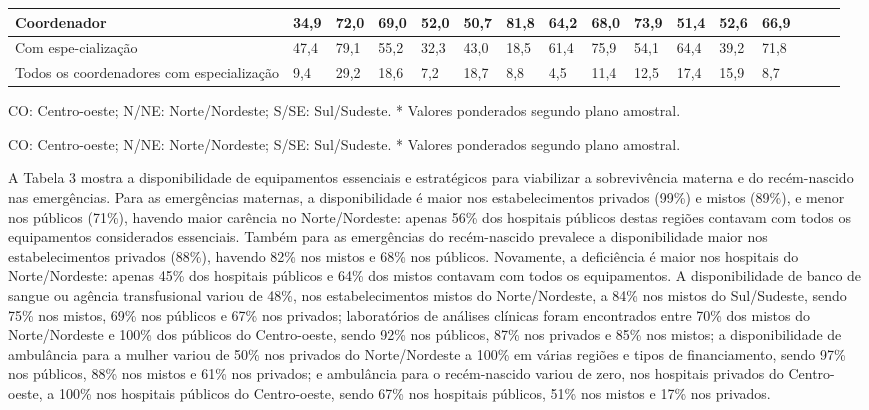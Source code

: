 \documentclass{article}
\begin{document}
\begin{table}
\begin{xtabular}{ l | l | l | l l | l | l | l | l | l | l | l | l | l | l | l }
Coordenador
& 34,9
& 72,0
& 69,0
& 52,0
& 50,7
& 81,8
& 64,2
& 68,0
& 73,9
& 51,4
& 52,6
& 66,9
\\ \hline

Com espe-cialização
& 47,4
& 79,1
& 55,2
& 32,3
& 43,0
& 18,5
& 61,4
& 75,9
& 54,1
& 64,4
& 39,2
& 71,8
\\ \hline

Todos os coordenadores com especialização
& 9,4
& 29,2
& 18,6
& 7,2
& 18,7
& 8,8
& 4,5
& 11,4
& 12,5
& 17,4
& 15,9
& 8,7
\\ \hline

\end{xtabular}
\end{table}

CO: Centro-oeste; N/NE: Norte/Nordeste; S/SE: Sul/Sudeste. * Valores
ponderados segundo plano amostral.

CO: Centro-oeste; N/NE: Norte/Nordeste; S/SE: Sul/Sudeste. * Valores
ponderados segundo plano amostral.

A Tabela 3 mostra a disponibilidade de
equipamentos essenciais e estratégicos para viabilizar a sobrevivência materna e
do
recém-nascido nas emergências. Para as emergências maternas, a disponibilidade é
maior nos estabelecimentos privados (99\%) e mistos (89\%), e menor nos públicos
(71\%), havendo maior carência no Norte/Nordeste: apenas 56\% dos hospitais
públicos
destas regiões contavam com todos os equipamentos considerados essenciais.
Também
para as emergências do recém-nascido prevalece a disponibilidade maior nos
estabelecimentos privados (88\%), havendo 82\% nos mistos e 68\% nos públicos.
Novamente, a deficiência é maior nos hospitais do Norte/Nordeste: apenas 45\%
dos
hospitais públicos e 64\% dos mistos contavam com todos os equipamentos. A
disponibilidade de banco de sangue ou agência transfusional variou de 48\%, nos
estabelecimentos mistos do Norte/Nordeste, a 84\% nos mistos do Sul/Sudeste,
sendo
75\% nos mistos, 69\% nos públicos e 67\% nos privados; laboratórios de análises
clínicas foram encontrados entre 70\% dos mistos do Norte/Nordeste e 100\% dos
públicos do Centro-oeste, sendo 92\% nos públicos, 87\% nos privados e 85\% nos
mistos;
a disponibilidade de ambulância para a mulher variou de 50\% nos privados do
Norte/Nordeste a 100\% em várias regiões e tipos de financiamento, sendo 97\%
nos
públicos, 88\% nos mistos e 61\% nos privados; e ambulância para o recém-nascido
variou de zero, nos hospitais privados do Centro-oeste, a 100\% nos hospitais
públicos do Centro-oeste, sendo 67\% nos hospitais públicos, 51\% nos mistos e
17\% nos
privados.
\end{document}
